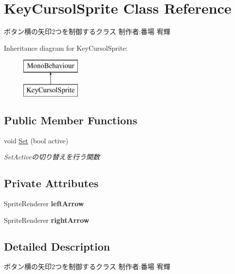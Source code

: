 \hypertarget{class_key_cursol_sprite}{}\section{Key\+Cursol\+Sprite Class Reference}
\label{class_key_cursol_sprite}


ボタン横の矢印2つを制御するクラス 制作者\+:番場 宥輝  


Inheritance diagram for Key\+Cursol\+Sprite\+:\begin{figure}[H]
\begin{center}
\leavevmode
\includegraphics[height=2.000000cm]{class_key_cursol_sprite}
\end{center}
\end{figure}
\subsection*{Public Member Functions}
\begin{DoxyCompactItemize}
\item 
void \hyperlink{class_key_cursol_sprite_af7bfcfecf02445d3f94c86df3256c15b}{Set} (bool active)
\begin{DoxyCompactList}\small\item\em Set\+Activeの切り替えを行う関数 \end{DoxyCompactList}\end{DoxyCompactItemize}
\subsection*{Private Attributes}
\begin{DoxyCompactItemize}
\item 
\mbox{\label{class_key_cursol_sprite_a8ffb8808f31b20e8d6ab6237dc0ed312}} 
Sprite\+Renderer {\bfseries left\+Arrow}
\item 
\mbox{\label{class_key_cursol_sprite_a7cee360aa2e19fbe0c34486699b25347}} 
Sprite\+Renderer {\bfseries right\+Arrow}
\end{DoxyCompactItemize}


\subsection{Detailed Description}
ボタン横の矢印2つを制御するクラス 制作者\+:番場 宥輝 



